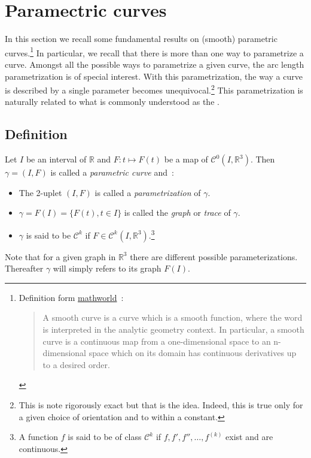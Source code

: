 \section{Paramectric curves}\label{sec:paramcrvs}

In this section we recall some fundamental results on (smooth) parametric curves.\footnote{Definition form \href{http://mathworld.wolfram.com/SmoothCurve.html}{mathworld}~: \blockquote{A smooth curve is a curve which is a smooth function,  where the word  is interpreted in the analytic geometry context. In particular, a smooth curve is a continuous map from a one-dimensional space to an n-dimensional space which on its domain has continuous derivatives up to a desired order.}.} In particular, we recall that there is more than one way to parametrize a curve. Amongst all the possible ways to parametrize a given curve, the arc length parametrization is of special interest. With this parametrization, the way a curve is described by a single parameter becomes unequivocal.\footnote{This is note rigorously exact but that is the idea. Indeed, this is true only for a given choice of orientation and to within a constant.} This parametrization is naturally related to what is commonly understood as the . 

\subsection{Definition}
Let $I$ be an interval of $\mathbb{R}$ and $F\colon t \mapsto F(t)$ be a map of ${\mathcal{C}}^{0}(I,{\mathbb{R}}^3)$. Then $\gamma=(I,F)$ is called a \emph{parametric curve} and~:
\begin{itemize}
	\item The 2-uplet $(I,F)$ is called a \emph{parametrization} of $\gamma$.
	\item $\gamma = F(I) = \{F(t), t \in I\}$ is called the \emph{graph} or \emph{trace} of $\gamma$.
	\item $\gamma$ is said to be ${\mathcal{C}}^{k}$ if $F \in {\mathcal{C}^{k}}^{}(I,{\mathbb{R}}^3)$.\footnote{A function $f$ is said to be of class $\mathcal{C}^{k}$ if $f,f',f'', \ldots, f^{(k)}$ exist and are continuous.}
\end{itemize}
Note that for a given graph in ${\mathbb{R}}^3$ there are different possible parameterizations. Thereafter $\gamma$ will simply refers to its graph $F(I)$. 

